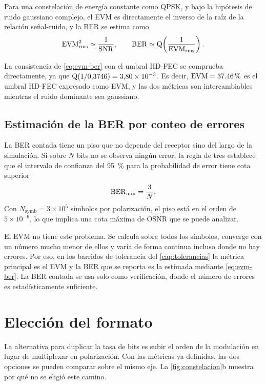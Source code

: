 Para una constelaci\'on de energ\'ia constante como QPSK, y bajo la
hip\'otesis de ruido gaussiano complejo, el EVM es directamente el inverso de
la ra\'iz de la relaci\'on se\~nal-ruido, y la BER se estima como
\begin{equation}
  \mathrm{EVM}_{\mathrm{rms}}^{2} \simeq \frac{1}{\mathrm{SNR}},
  \qquad
  \mathrm{BER} \simeq \operatorname{Q}\!\left(\frac{1}{\mathrm{EVM}_{\mathrm{rms}}}\right).
  \label{eq:evm-ber}
\end{equation}

La consistencia de \eqref{eq:evm-ber} con el umbral HD-FEC se comprueba
directamente, ya que $\operatorname{Q}(1/0{,}3746) = 3{,}80\times10^{-3}$. Es decir,
$\mathrm{EVM} = \SI{37.46}{\percent}$ es el umbral HD-FEC expresado como EVM, y las dos
m\'etricas son intercambiables mientras el ruido dominante sea gaussiano.



\subsection{Estimaci\'on de la BER por conteo de errores}
\label{sec:coh-conteo}

La BER contada tiene un piso que no depende del receptor sino del largo de la
simulaci\'on. Si sobre $N$ bits no se observa ning\'un error, la regla de tres
establece que el intervalo de confianza del \SI{95}{\percent} para la
probabilidad de error tiene cota superior
\begin{equation}
  \mathrm{BER}_{\min} = \frac{3}{N}.
  \label{eq:piso-conteo}
\end{equation}
Con $N_{\mathrm{symb}} = 3\times10^{5}$ s\'imbolos por polarizaci\'on, el piso
est\'a en el orden de $5\times10^{-6}$, lo que implica una cota m\'axima de
OSNR que se puede analizar.

El EVM no tiene este problema. Se calcula sobre todos los s\'imbolos, converge
con un n\'umero mucho menor de ellos y var\'ia de forma continua incluso donde
no hay errores. Por eso, en los barridos de tolerancia del
\cref{cap:tolerancias} la m\'etrica principal es el EVM y la BER que se reporta
es la estimada mediante \eqref{eq:evm-ber}. La BER contada se usa solo como
verificaci\'on, donde el n\'umero de errores es estad\'isticamente suficiente.

\section{Elecci\'on del formato}
\label{sec:coh-eleccion}

La alternativa para duplicar la tasa de bits es subir el orden de la
modulaci\'on en lugar de multiplexar en polarizaci\'on. Con las m\'etricas ya
definidas, las dos opciones se pueden comparar sobre el mismo eje. La
\cref{fig:constelacion}b muestra por qu\'e no se eligi\'o este camino.

